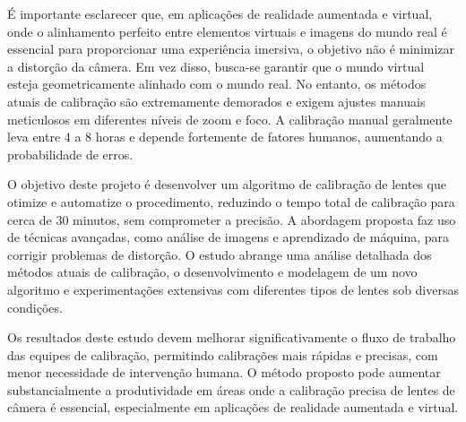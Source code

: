 \noindent É importante esclarecer que, em aplicações de realidade aumentada e virtual, onde o alinhamento perfeito entre elementos virtuais e imagens do mundo real é essencial para proporcionar uma experiência imersiva, o objetivo não é minimizar a distorção da câmera. Em vez disso, busca-se garantir que o mundo virtual esteja geometricamente alinhado com o mundo real. No entanto, os métodos atuais de calibração são extremamente demorados e exigem ajustes manuais meticulosos em diferentes níveis de zoom e foco. A calibração manual geralmente leva entre 4 a 8 horas e depende fortemente de fatores humanos, aumentando a probabilidade de erros.

\noindent O objetivo deste projeto é desenvolver um algoritmo de calibração de lentes que otimize e automatize o procedimento, reduzindo o tempo total de calibração para cerca de 30 minutos, sem comprometer a precisão. A abordagem proposta faz uso de técnicas avançadas, como análise de imagens e aprendizado de máquina, para corrigir problemas de distorção. O estudo abrange uma análise detalhada dos métodos atuais de calibração, o desenvolvimento e modelagem de um novo algoritmo e experimentações extensivas com diferentes tipos de lentes sob diversas condições.

\noindent Os resultados deste estudo devem melhorar significativamente o fluxo de trabalho das equipes de calibração, permitindo calibrações mais rápidas e precisas, com menor necessidade de intervenção humana. O método proposto pode aumentar substancialmente a produtividade em áreas onde a calibração precisa de lentes de câmera é essencial, especialmente em aplicações de realidade aumentada e virtual.

